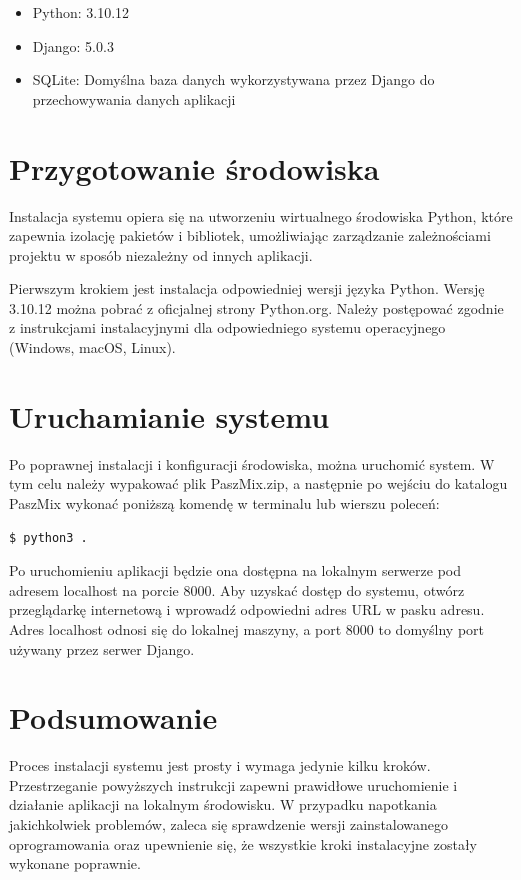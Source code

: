 \documentclass[shortabstract]{iithesis}
\begin{document}
\begin{itemize} \item Python: 3.10.12 \item Django: 5.0.3 \item SQLite: Domyślna baza danych wykorzystywana przez Django do przechowywania danych aplikacji \end{itemize}

\section{Przygotowanie środowiska}

Instalacja systemu opiera się na utworzeniu wirtualnego środowiska Python, które zapewnia izolację pakietów i bibliotek, umożliwiając zarządzanie zależnościami projektu w sposób niezależny od innych aplikacji.

Pierwszym krokiem jest instalacja odpowiedniej wersji języka Python. Wersję 3.10.12 można pobrać z oficjalnej strony Python.org. Należy postępować zgodnie z instrukcjami instalacyjnymi dla odpowiedniego systemu operacyjnego (Windows, macOS, Linux).

\section{Uruchamianie systemu}

Po poprawnej instalacji i konfiguracji środowiska, można uruchomić system. W tym celu należy wypakować plik PaszMix.zip, a następnie po wejściu do katalogu PaszMix wykonać poniższą komendę w terminalu lub wierszu poleceń:

\begin{verbatim}$ python3 . \end{verbatim}

Po uruchomieniu aplikacji będzie ona dostępna na lokalnym serwerze pod adresem localhost na porcie 8000. Aby uzyskać dostęp do systemu, otwórz przeglądarkę internetową i wprowadź odpowiedni adres URL w pasku adresu. Adres localhost odnosi się do lokalnej maszyny, a port 8000 to domyślny port używany przez serwer Django.

\section{Podsumowanie}

Proces instalacji systemu jest prosty i wymaga jedynie kilku kroków. Przestrzeganie powyższych instrukcji zapewni prawidłowe uruchomienie i działanie aplikacji na lokalnym środowisku. W przypadku napotkania jakichkolwiek problemów, zaleca się sprawdzenie wersji zainstalowanego oprogramowania oraz upewnienie się, że wszystkie kroki instalacyjne zostały wykonane poprawnie.
\end{document}
